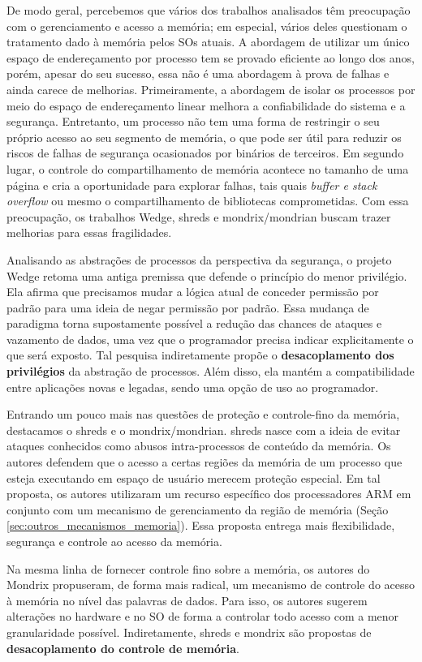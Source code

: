 De modo geral, percebemos que vários dos trabalhos analisados têm preocupação com o gerenciamento e acesso a
memória; em especial, vários deles questionam o tratamento dado à memória pelos
SOs atuais.  A abordagem de utilizar um único espaço de endereçamento por
processo tem se provado eficiente ao longo dos anos, porém, apesar do seu
sucesso, essa não é uma abordagem à prova de falhas e ainda carece de
melhorias. Primeiramente, a abordagem de isolar os processos por meio do
espaço de endereçamento linear melhora a confiabilidade do sistema e a
segurança. Entretanto, um processo não tem uma forma de restringir o seu próprio
acesso ao seu segmento de memória, o que pode ser útil para reduzir os riscos de
falhas de segurança ocasionados por binários de terceiros. Em segundo lugar, o
controle do compartilhamento de memória acontece no tamanho de uma página e
cria a oportunidade para explorar falhas, tais quais \emph{buffer e stack
overflow} ou mesmo o compartilhamento de bibliotecas comprometidas. Com essa preocupação, os
trabalhos Wedge, shreds e mondrix/mondrian buscam trazer melhorias para essas fragilidades.

Analisando as abstrações de processos da perspectiva da segurança, o projeto
Wedge retoma uma antiga premissa que defende o princípio do menor privilégio.
Ela afirma que precisamos mudar a lógica atual de conceder permissão por
padrão para uma ideia de negar permissão por padrão. Essa mudança de paradigma
torna supostamente possível a redução das chances de ataques e vazamento de
dados, uma vez que o programador precisa indicar explicitamente o que será
exposto. Tal pesquisa indiretamente propõe o \textbf{desacoplamento dos
privilégios} da abstração de processos. Além disso, ela mantém a
compatibilidade entre aplicações novas e legadas, sendo uma opção de uso ao programador.

Entrando um pouco mais nas questões de proteção e controle-fino da memória,
destacamos o shreds e o mondrix/mondrian. shreds nasce com a ideia de evitar
ataques conhecidos como abusos intra-processos de conteúdo da memória. Os
autores defendem que o acesso a certas regiões da memória de um processo
que esteja executando em espaço de usuário merecem proteção especial. Em tal proposta, os
autores utilizaram um recurso específico dos processadores ARM em conjunto com
um mecanismo de gerenciamento da região de memória (Seção
\ref{sec:outros_mecanismos_memoria}). Essa proposta entrega mais flexibilidade,
segurança e controle ao acesso da memória.

Na mesma linha de fornecer controle fino sobre a memória, os autores do Mondrix
propuseram, de forma mais radical, um mecanismo de controle do acesso à memória
no nível das palavras de dados. Para isso, os autores sugerem alterações no
hardware e no SO de forma a controlar todo acesso com a menor granularidade
possível. Indiretamente, shreds e mondrix são propostas de
\textbf{desacoplamento do controle de memória}.

